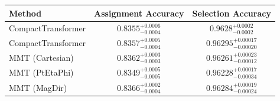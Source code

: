     \begin{tabular}{lcc}
        \toprule
        Method & Assignment Accuracy & Selection Accuracy \\
        \midrule
        CompactTransformer & $0.8355^{+0.0006}_{-0.0004}$ & $0.9628^{+0.0002}_{-0.0002}$ \\
        CompactTransformer & $0.8357^{+0.0005}_{-0.0004}$ & $0.96295^{+0.00017}_{-0.00020}$ \\
        MMT (Cartesian) & $0.8362^{+0.0003}_{-0.0003}$ & $0.96261^{+0.00023}_{-0.00012}$ \\
        MMT (PtEtaPhi) & $0.8349^{+0.0005}_{-0.0005}$ & $0.96228^{+0.00017}_{-0.00034}$ \\
        MMT (MagDir) & $0.8366^{+0.0002}_{-0.0004}$ & $0.96284^{+0.00019}_{-0.00024}$ \\
        \bottomrule
    \end{tabular}